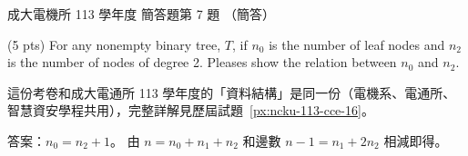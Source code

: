 \begin{pastexam}[label={px:ncku-113-ee-16}]{成大電機所 113 學年度 簡答題第 7 題}
（簡答）

(5 pts) For any nonempty binary tree, $T$, if $n_0$ is the number of leaf nodes and $n_2$ is the
number of nodes of degree 2. Pleases show the relation between $n_0$ and $n_2$.
\end{pastexam}

\begin{pastsoln}
這份考卷和成大電通所 113 學年度的「資料結構」是同一份（電機系、電通所、智慧資安學程共用），完整詳解見歷屆試題~\ref{px:ncku-113-cce-16}。

答案：$n_0 = n_2 + 1$。 由 $n = n_0 + n_1 + n_2$ 和邊數 $n - 1 = n_1 + 2n_2$ 相減即得。
\end{pastsoln}
